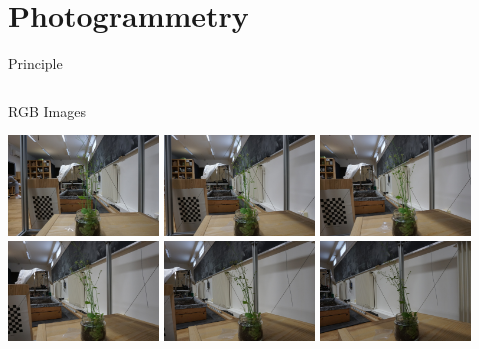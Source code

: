 \documentclass{beamer}
\begin{document}
\section{Photogrammetry}
\begin{frame}
    \tableofcontents[sectionstyle=show/shaded]
\end{frame}
\begin{frame}{Principle}
    \begin{columns}
        \begin{column}{0.45\textwidth}
            \centering
            RGB Images

            \includegraphics[width=0.3\textwidth]{images/rgb000.jpg}
            \includegraphics[width=0.3\textwidth]{images/rgb001.jpg}
            \includegraphics[width=0.3\textwidth]{images/rgb002.jpg}
            \includegraphics[width=0.3\textwidth]{images/rgb003.jpg}
            \includegraphics[width=0.3\textwidth]{images/rgb004.jpg}
            \includegraphics[width=0.3\textwidth]{images/rgb005.jpg}

\end{column}
\end{columns}
\end{frame}
\end{document}
